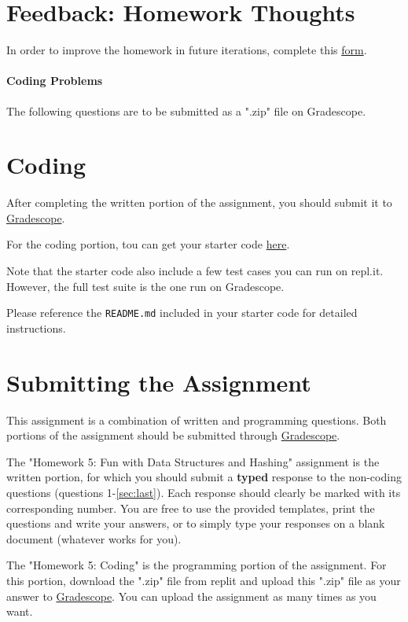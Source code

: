 \documentclass [12pt]{article}
\begin{document}



\section{Feedback: Homework Thoughts }

In order to improve the homework in future iterations, complete this \href{https://forms.gle/h3mZjdF4e1y4tXiZ8}{form}.




\pagebreak
\begin{Instruction}

\paragraph{Coding Problems} The following questions are to be submitted as a ".zip" file on Gradescope. 

\end{Instruction}

\section{Coding }
After completing the written portion of the assignment, you should submit it to \href{https://www.gradescope.com/courses/350304}{Gradescope}.

For the coding portion, tou can get your starter code \href{https://replit.com/team/COMP285/HW5-Code}{here}.

Note that the starter code also include a few test cases you can run on repl.it. However, the full test suite is the one run on Gradescope.

Please reference the \texttt{README.md} included in your starter code for detailed instructions.

\section*{Submitting the Assignment}

This assignment is a combination of written and programming questions. Both portions of the assignment should be submitted through \href{https://www.gradescope.com/courses/350304}{Gradescope}.

The "Homework 5: Fun with Data Structures and Hashing" assignment is the written portion, for which you should submit a \textbf{typed} response to the non-coding questions (questions 1-\ref{sec:last}). Each response should clearly be marked with its corresponding number. You are free to use the provided templates, print the questions and write your answers, or to simply type your responses on a blank document (whatever works for you).

The "Homework 5: Coding" is the programming portion of the assignment. For this portion, download the ".zip" file from replit and upload this ".zip" file as your answer to \href{https://www.gradescope.com/courses/350304}{Gradescope}. You can upload the assignment as many times as you want.
\end{document}

